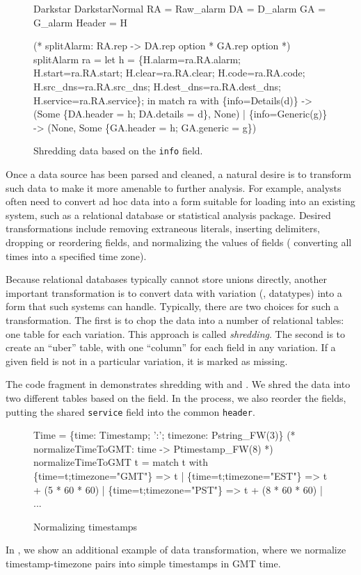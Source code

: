 \begin{figure}
\begin{code}\scriptsize
{} Darkstar
 DarkstarNormal
 RA = Raw\_alarm
 DA = D\_alarm
 GA = G\_alarm
 Header = H

(* splitAlarm: RA.rep -> DA.rep option * GA.rep option *)
 splitAlarm ra =
    let h = 
       \{H.alarm=ra.RA.alarm; H.start=ra.RA.start; 
         H.clear=ra.RA.clear; H.code=ra.RA.code;
         H.src\_dns=ra.RA.src\_dns; H.dest\_dns=ra.RA.dest\_dns;
         H.service=ra.RA.service\};
    in match ra with
        \{info=Details(d)\} -> 
        (Some \{DA.header = h; DA.details = d\}, None)
      | \{info=Generic(g)\} ->
        (None, Some \{GA.header = h; GA.generic = g\})    
  \end{code}
  \caption{Shredding \darkstar{} data based on the {\tt info} field.}
  \label{fig:ex-no-err-check}
\end{figure}

Once a data source has been parsed and cleaned, a natural desire is to
transform such data to make it more amenable to further analysis.  For
example, analysts often need to convert ad hoc data into a form
suitable for loading into an existing system, such as a relational
database or statistical analysis package. Desired transformations
include removing extraneous literals, inserting delimiters, dropping
or reordering fields, and normalizing the values of fields (\eg{}
converting all times into a specified time zone).

Because relational databases typically cannot store unions directly,
another important transformation is to convert data with variation
(\ie{}, datatypes) into a form that such systems can handle.
Typically, there are two choices for such a transformation.  The first
is to chop the data into a number of relational tables: one table for
each variation.  This approach is called \textit{shredding}. The
second is to create an ``uber'' table, with one ``column'' for each
field in any variation.  If a given field is not in a particular
variation, it is marked as missing. 

The code fragment in  demonstrates
shredding with \padsml{} and \ocaml{}. We shred the data into two
different tables based on the  field. In the process, we also
reorder the fields, putting the shared \texttt{service} field into
the common \texttt{header}.

\begin{figure}
  \centering
  \begin{code}\scriptsize
{} Time = \{time: Timestamp;
               ':'; timezone: Pstring_FW(3)\}
\mbox{}
(* normalizeTimeToGMT: time -> Ptimestamp_FW(8) *)
 normalizeTimeToGMT t = 
    match t with
      \{time=t;timezone="GMT"\} => t
    | \{time=t;timezone="EST"\} => t + (5 * 60 * 60)
    | \{time=t;timezone="PST"\} => t + (8 * 60 * 60)
    | ... \end{code}
  \caption{Normalizing timestamps}
  \label{fig:ex-normalize}
\end{figure}

In , we show an additional example of data
transformation, where we normalize timestamp-timezone pairs into
simple timestamps in GMT time.

